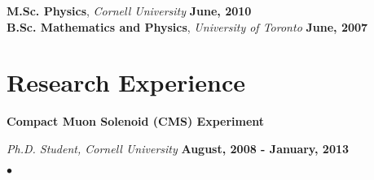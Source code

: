 \documentclass[margin,line]{res}
\newenvironment{list1}{
  \begin{list}{\ding{113}}{%
      \setlength{\itemsep}{0in}
      \setlength{\parsep}{0in} \setlength{\parskip}{0in}
      \setlength{\topsep}{0in} \setlength{\partopsep}{0in} 
      \setlength{\leftmargin}{0.17in}}}{\end{list}}
\newenvironment{list2}{
  \begin{list}{$\bullet$}{%
      \setlength{\itemsep}{0in}
      \setlength{\parsep}{0in} \setlength{\parskip}{0in}
      \setlength{\topsep}{0in} \setlength{\partopsep}{0in} 
      \setlength{\leftmargin}{0.2in}}}{\end{list}}
\begin{document}
\begin{resume}
\vspace{-.1in}
{\bf M.Sc. Physics}, \textit{Cornell University} \hfill {\bf June, 2010}\\
{\bf B.Sc. Mathematics and Physics}, \textit{University of Toronto} \hfill {\bf June, 2007}\\
\vspace*{-.1in}
\vspace{-.3cm}
\section{\sc Research Experience}
{\bf Compact Muon Solenoid (CMS) Experiment}

\vspace{-.3cm}
{\em Ph.D. Student, Cornell University} \hfill {\bf August, 2008 - January, 2013}\\

\vspace*{-5mm}
\vspace*{2mm}
\begin{list2}




\end{list2}
\end{resume}
\end{document}
